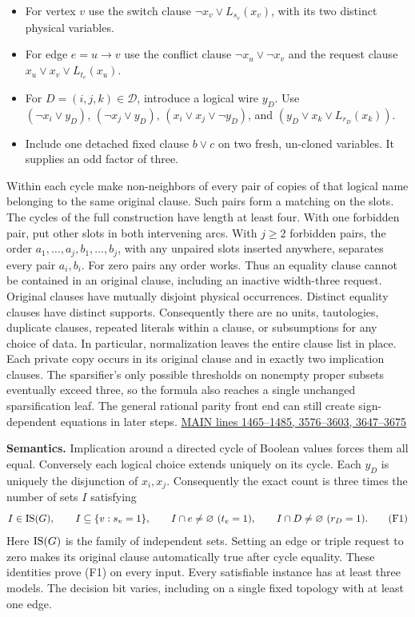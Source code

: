 \documentclass[11pt,a4paper]{article}
\providecommand{\tightlist}{\setlength{\itemsep}{0pt}\setlength{\parskip}{0pt}}
\begin{document}
\begin{itemize}
\tightlist
\item
  For vertex \(v\) use the switch clause \(\neg x_v\vee L_{s_v}(x_v)\),
  with its two distinct physical variables.
\item
  For edge \(e=u\to v\) use the conflict clause \(\neg x_u\vee\neg x_v\)
  and the request clause \(x_u\vee x_v\vee L_{t_e}(x_u)\).
\item
  For \(D=(i,j,k)\in\mathcal D\), introduce a logical wire \(y_D\). Use
  \((\neg x_i\vee y_D),\,(\neg x_j\vee y_D),\,(x_i\vee x_j\vee\neg y_D)\),
  and \((y_D\vee x_k\vee L_{r_D}(x_k))\).
\item
  Include one detached fixed clause \(b\vee c\) on two fresh, un-cloned
  variables. It supplies an odd factor of three.
\end{itemize}

Within each cycle make non-neighbors of every pair of copies of that
logical name belonging to the same original clause. Such pairs form a
matching on the slots. The cycles of the full construction have length
at least four. With one forbidden pair, put other slots in both
intervening arcs. With \(j\ge2\) forbidden pairs, the order
\(a_1,\ldots,a_j,b_1,\ldots,b_j\), with any unpaired slots inserted
anywhere, separates every pair \(a_i,b_i\). For zero pairs any order
works. Thus an equality clause cannot be contained in an original
clause, including an inactive width-three request. Original clauses have
mutually disjoint physical occurrences. Distinct equality clauses have
distinct supports. Consequently there are no units, tautologies,
duplicate clauses, repeated literals within a clause, or subsumptions
for any choice of data. In particular, normalization leaves the entire
clause list in place. Each private copy occurs in its original clause
and in exactly two implication clauses. The sparsifier's only possible
thresholds on nonempty proper subsets eventually exceed three, so the
formula also reaches a single unchanged sparsification leaf. The general
rational parity front end can still create sign-dependent equations in
later steps.
\href{https://github.com/openai/math/blob/main/preprints/The-Exponential-Time-Hypothesis-is-False-October-25-2026/build/main_full_version.tex\#L3647}{MAIN
lines 1465--1485, 3576--3603, 3647--3675}

\textbf{Semantics.} Implication around a directed cycle of Boolean
values forces them all equal. Conversely each logical choice extends
uniquely on its cycle. Each \(y_D\) is uniquely the disjunction of
\(x_i,x_j\). Consequently the exact count is three times the number of
sets \(I\) satisfying \[
 I\in{\rm IS}(G),\qquad I\subseteq\{v:s_v=1\},\qquad
 I\cap e\ne\varnothing\ (t_e=1),\qquad I\cap D\ne\varnothing\ (r_D=1).
 \tag{F1}
\] Here \({\rm IS}(G)\) is the family of independent sets. Setting an
edge or triple request to zero makes its original clause automatically
true after cycle equality. These identities prove (F1) on every input.
Every satisfiable instance has at least three models. The decision bit
varies, including on a single fixed topology with at least one edge.
\end{document}
